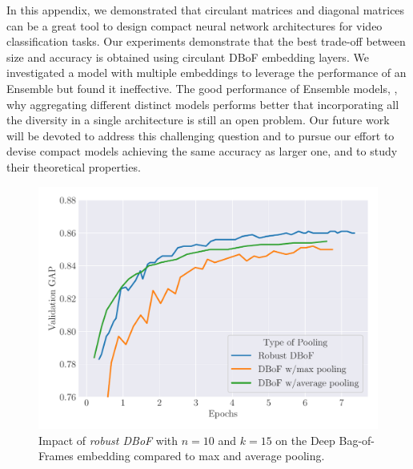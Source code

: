 In this appendix, we demonstrated that circulant matrices and diagonal matrices can be a great tool to design compact neural network architectures for video classification tasks.
Our experiments demonstrate that the best trade-off between size and accuracy is obtained using circulant DBoF embedding layers.
We investigated a model with multiple embeddings to leverage the performance of an Ensemble but found it ineffective.
The good performance of Ensemble models, \ie, why aggregating different distinct models performs better that incorporating all the diversity in a single architecture is still an open problem.
Our future work will be devoted to address this challenging question and to pursue our effort to devise compact models achieving the same accuracy as larger one, and to study their theoretical properties.


\begin{figure}[p!]
  \centering
  \includegraphics[width=\scalefigure\textwidth]{figures/appendix/ap2-training_video_classification/graph_robust_dbof.pdf}
  \caption{Impact of \emph{robust DBoF} with $n=10$ and $k=15$ on the Deep Bag-of-Frames embedding compared to max and average pooling.}
  \label{figure:ap2-learning_curve_bagging}
\end{figure}

